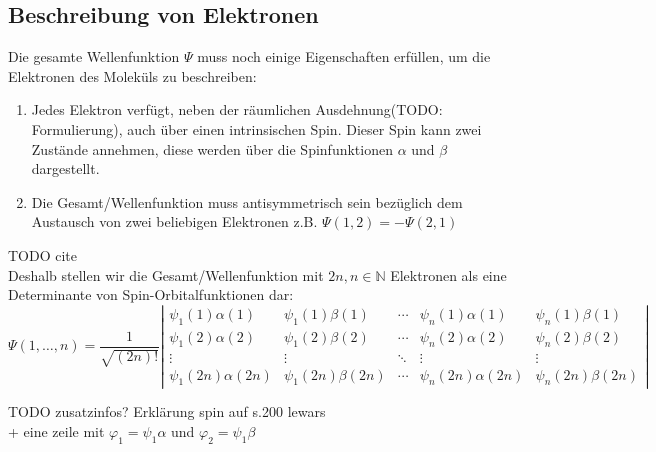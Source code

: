 \subsection{Beschreibung von Elektronen}
Die gesamte Wellenfunktion $\Psi$ muss noch einige Eigenschaften erfüllen, 
um die Elektronen des Moleküls zu beschreiben:

\begin{enumerate}
  \item Jedes Elektron verfügt, neben der räumlichen Ausdehnung(TODO: Formulierung), 
  auch über einen intrinsischen Spin. Dieser Spin kann zwei Zustände annehmen, diese werden über
  die Spinfunktionen $\alpha$ und $\beta$ dargestellt.
  \item Die Gesamt\-/Wellenfunktion muss antisymmetrisch sein 
  bezüglich dem Austausch von zwei beliebigen Elektronen z.B.
  $\Psi(1, 2) = - \Psi(2, 1)$
\end{enumerate}
TODO cite\\
Deshalb stellen wir die Gesamt\-/Wellenfunktion mit 
$2n, n \in \mathbb{N}$ Elektronen als eine Determinante von Spin-Orbitalfunktionen dar:
\begin{equation}\label{slater}
\Psi(1, \dots, n) = 
\frac{1}{\sqrt{(2n)!}}\left\lvert
\begin{array}{ccccc} 
\psi_1(1)\alpha(1) & \psi_1(1)\beta(1) & \cdots & \psi_n(1)\alpha(1) & \psi_n(1)\beta(1)\\ 
\psi_1(2)\alpha(2) & \psi_1(2)\beta(2) & \cdots & \psi_n(2)\alpha(2) & \psi_n(2)\beta(2)\\ 
    \vdots         &       \vdots      & \ddots &       \vdots       &       \vdots     \\ 
\psi_1(2n)\alpha(2n) & \psi_1(2n)\beta(2n) & \cdots & \psi_n(2n)\alpha(2n) & \psi_n(2n) \beta(2n)
\end{array}
\right \rvert
\end{equation}

TODO zusatzinfos? Erklärung spin auf s.200 lewars\\
+ eine zeile mit $\varphi_1 = \psi_1\alpha$ und $\varphi_2 = \psi_1\beta$